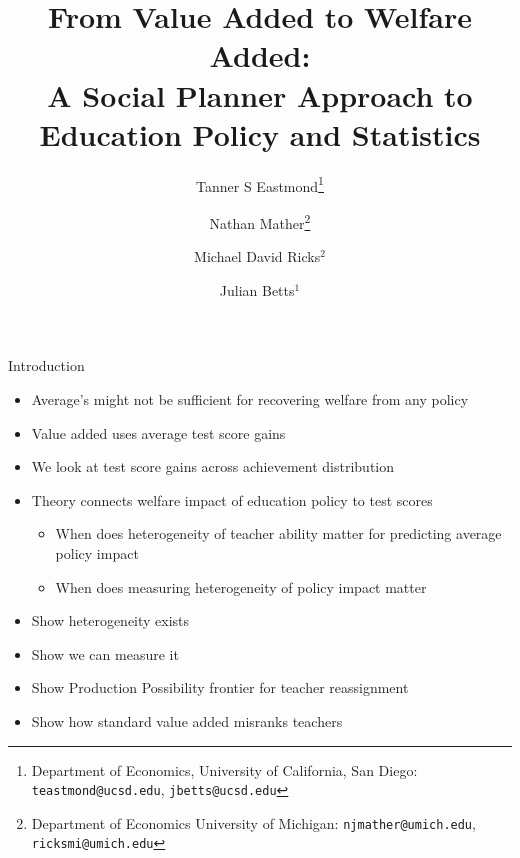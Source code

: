 \documentclass[t,aspectratio=169]{beamer}
\title{From Value Added to Welfare Added: \\ A Social Planner Approach to Education Policy and Statistics}
\author{Tanner S Eastmond\thanks{Department of Economics, University of California, San Diego: \texttt{teastmond@ucsd.edu}, \texttt{jbetts@ucsd.edu}} \and Nathan Mather\thanks{Department of Economics University of Michigan: \texttt{njmather@umich.edu}, \texttt{ricksmi@umich.edu}} \and Michael David Ricks$^2$ \and Julian Betts$^1$}
\begin{document}
    
 \frame{\titlepage}

 \begin{frame}{Introduction}

    \begin{itemize}
        \vspace{.75em}
        \setlength\itemsep{.75em}
        \item Average's might not be sufficient for recovering welfare from any policy 
        \item Value added uses average test score gains 
        \item We look at test score gains across achievement distribution 
        \item Theory connects welfare impact of education policy to test scores
        \begin{itemize}
            \vspace{.4em}
            \setlength\itemsep{.4em}
            \item When does heterogeneity of teacher ability matter for predicting average policy impact 
            \item When does measuring heterogeneity of policy impact matter 
        \end{itemize}
        \item Show heterogeneity exists 
        \item Show we can measure it
        \item Show Production Possibility frontier for teacher reassignment 
        \item Show how standard value added misranks teachers
    \end{itemize}
     
 \end{frame}

\end{document}
